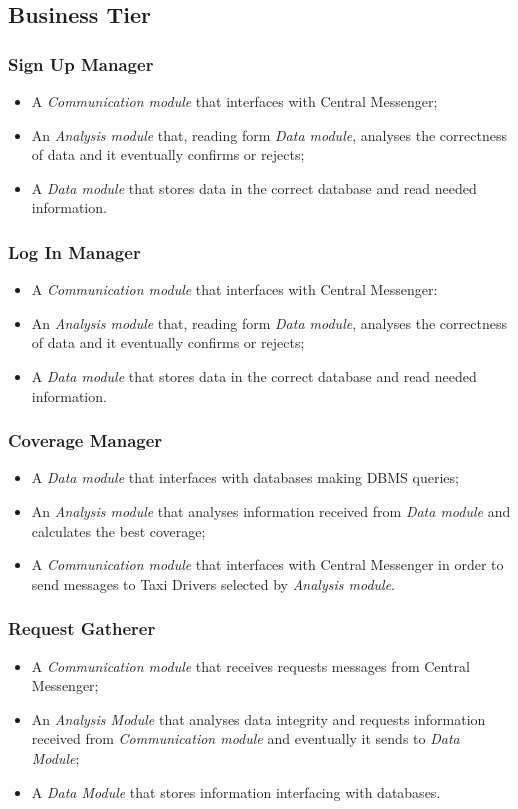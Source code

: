 \subsection{Business Tier}
\subsubsection{Sign Up Manager}
\begin{itemize}
\item A \emph{Communication module} that interfaces with Central Messenger;
\item An \emph{Analysis module} that, reading form \emph{Data module}, analyses the correctness of data and it eventually confirms or rejects;
\item A \emph{Data module} that stores data in the correct database and read needed information.
\end{itemize}

\subsubsection{Log In Manager}
\begin{itemize}
\item A \emph{Communication module} that interfaces with Central Messenger:
\item An \emph{Analysis module} that, reading form \emph{Data module}, analyses the correctness of data and it eventually confirms or rejects;
\item A \emph{Data module} that stores data in the correct database and read needed information.
\end{itemize}

\subsubsection{Coverage Manager}
\begin{itemize}
\item A \emph{Data module} that interfaces with databases making DBMS queries;
\item An \emph{Analysis module} that analyses information received from \emph{Data module} and calculates the best coverage;
\item A \emph{Communication module} that interfaces with Central Messenger in order to send messages to Taxi Drivers selected by \emph{Analysis module}.
\end{itemize}

\subsubsection{Request Gatherer}
\begin{itemize}
\item A \emph{Communication module} that receives requests messages from Central Messenger;
\item An \emph{Analysis Module} that analyses data integrity and requests information received from \emph{Communication module} and eventually it sends to \emph{Data Module};
\item A \emph{Data Module} that stores information interfacing with databases.
\end{itemize}

